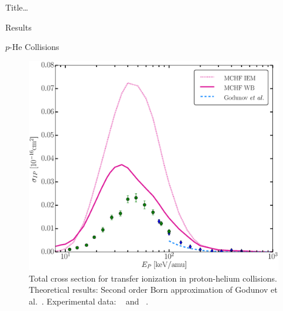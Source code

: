 \documentclass[letterpaper, 11 pt]{report}
\begin{document}
\begin{chapter}{ Title\dots \label{chap:p-he2p-he}}
\begin{section}{Results \label{sec:phe2p-res}}
\begin{subsection}{\texorpdfstring{$p$}{p}-He Collisions \label{sec:phe-res}}
\begin{figure}[ht]
\begin{minipage}{.49\linewidth}
               \centering
               \includegraphics[width = \linewidth]{./images/phe/phe-IP.eps}
               \caption[Total cross section for transfer ionization in proton-helium collisions.]
                       {Total cross section for transfer ionization in proton-helium collisions.
                        Theoretical results: Second order Born approximation of Godunov
                        et al.~\cite{Godunov-06}. Experimental data:
                        {\color{OliveGreen}{$\bullet$}}~\cite{SG89} and
                        {\color{blue}{$\blacklozenge$}}~\cite{SG85}. \label{fig:phe-ip}}
            \end{minipage}
         \end{figure}

         \begin{figure}[ht]
            \begin{minipage}{.49\linewidth}
               

\end{minipage}
\end{figure}
\end{subsection}
\end{section}
\end{chapter}
\end{document}
